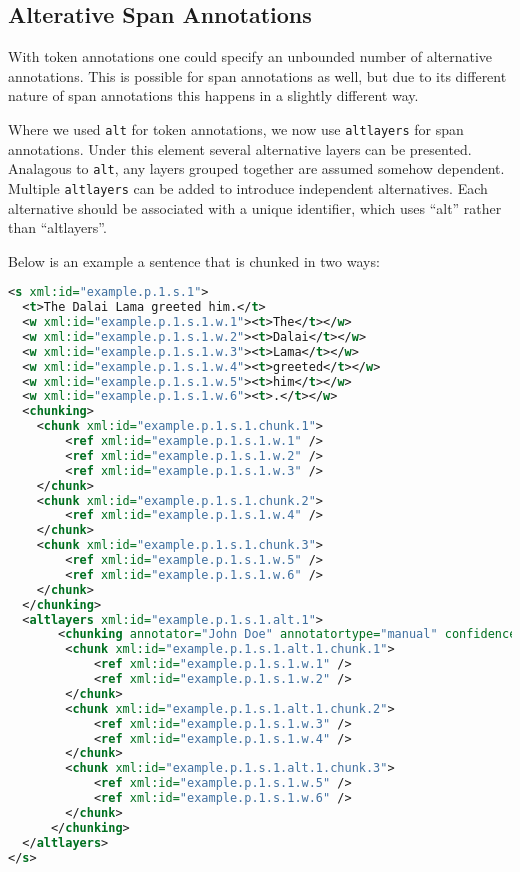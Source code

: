\documentclass[a4paper,12pt]{report}
\begin{document}
\subsection{Alterative Span Annotations}

With token annotations one could specify an unbounded number of alternative annotations. This is possible for span annotations as well, but due to its different nature of span annotations this happens in a slightly different way.

Where we used \texttt{alt} for token annotations, we now use \texttt{altlayers} for span annotations. Under this element several alternative layers can be presented. Analagous to \texttt{alt}, any layers grouped together are assumed somehow dependent. Multiple \texttt{altlayers} can be added to introduce independent alternatives. Each alternative should be associated with a unique identifier, which uses ``alt'' rather than ``altlayers''. 

Below is an example a sentence that is chunked in two ways:

\begin{lstlisting}[language=xml]
<s xml:id="example.p.1.s.1">
  <t>The Dalai Lama greeted him.</t>
  <w xml:id="example.p.1.s.1.w.1"><t>The</t></w>
  <w xml:id="example.p.1.s.1.w.2"><t>Dalai</t></w>
  <w xml:id="example.p.1.s.1.w.3"><t>Lama</t></w>
  <w xml:id="example.p.1.s.1.w.4"><t>greeted</t></w>
  <w xml:id="example.p.1.s.1.w.5"><t>him</t></w>
  <w xml:id="example.p.1.s.1.w.6"><t>.</t></w>
  <chunking>
    <chunk xml:id="example.p.1.s.1.chunk.1">       
        <ref xml:id="example.p.1.s.1.w.1" />       
        <ref xml:id="example.p.1.s.1.w.2" />       
        <ref xml:id="example.p.1.s.1.w.3" />        
    </chunk>
    <chunk xml:id="example.p.1.s.1.chunk.2">       
        <ref xml:id="example.p.1.s.1.w.4" />
    </chunk>
    <chunk xml:id="example.p.1.s.1.chunk.3">       
        <ref xml:id="example.p.1.s.1.w.5" />
        <ref xml:id="example.p.1.s.1.w.6" />
    </chunk>    
  </chunking>
  <altlayers xml:id="example.p.1.s.1.alt.1">
       <chunking annotator="John Doe" annotatortype="manual" confidence="0.0001">
        <chunk xml:id="example.p.1.s.1.alt.1.chunk.1">       
            <ref xml:id="example.p.1.s.1.w.1" />       
            <ref xml:id="example.p.1.s.1.w.2" />                       
        </chunk>
        <chunk xml:id="example.p.1.s.1.alt.1.chunk.2">       
            <ref xml:id="example.p.1.s.1.w.3" />  
            <ref xml:id="example.p.1.s.1.w.4" />
        </chunk>
        <chunk xml:id="example.p.1.s.1.alt.1.chunk.3">       
            <ref xml:id="example.p.1.s.1.w.5" />
            <ref xml:id="example.p.1.s.1.w.6" />
        </chunk>    
      </chunking>   
  </altlayers>
</s>
\end{lstlisting}
\end{document}
